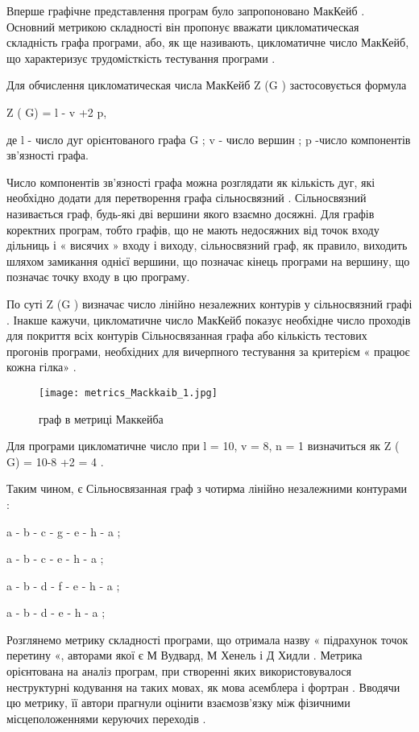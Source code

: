 Вперше графічне представлення програм було запропоновано МакКейб . Основний метрикою складності він пропонує вважати цикломатическая складність графа програми, або, як ще називають, цикломатичне число МакКейб, що характеризує трудомісткість тестування програми .

Для обчислення цикломатическая числа МакКейб Z (G ) застосовується формула

Z ( G) = l - v +2 p,

де l - число дуг орієнтованого графа G ; v - число вершин ; p -число компонентів зв'язності графа.

Число компонентів зв'язності графа можна розглядати як кількість дуг, які необхідно додати для перетворення графа сільносвязний . Сільносвязний називається граф, будь-які дві вершини якого взаємно досяжні. Для графів коректних програм, тобто графів, що не мають недосяжних від точок входу дільниць і « висячих » входу і виходу, сільносвязний граф, як правило, виходить шляхом замикання однієї вершини, що позначає кінець програми на вершину, що позначає точку входу в цю програму.

По суті Z (G ) визначає число лінійно незалежних контурів у сільносвязний графі . Інакше кажучи, цикломатичне число МакКейб показує необхідне число проходів для покриття всіх контурів Сільносвязанная графа або кількість тестових прогонів програми, необхідних для вичерпного тестування за критерієм « працює кожна гілка» .

\begin{figure}
    \centering
    \texttt{[image: metrics\_Mackkaib\_1.jpg]}
    \caption{граф в метриці Маккейба}
    \label{fig:awesome_image}
\end{figure}

Для програми цикломатичне число при l = 10, v = 8, n = 1 визначиться як Z ( G) = 10-8 +2 = 4 .

Таким чином, є Сільносвязанная граф з чотирма лінійно незалежними контурами :

a - b - c - g - e - h - a ;

a - b - c - e - h - a ;

a - b - d - f - e - h - a ;

a - b - d - e - h - a ;

Розглянемо метрику складності програми, що отримала назву « підрахунок точок перетину «, авторами якої є М Вудвард, М Хенель і Д Хидли . Метрика орієнтована на аналіз програм, при створенні яких використовувалося неструктурні кодування на таких мовах, як мова асемблера і фортран . Вводячи цю метрику, її автори прагнули оцінити взаємозв'язку між фізичними місцеположеннями керуючих переходів .

